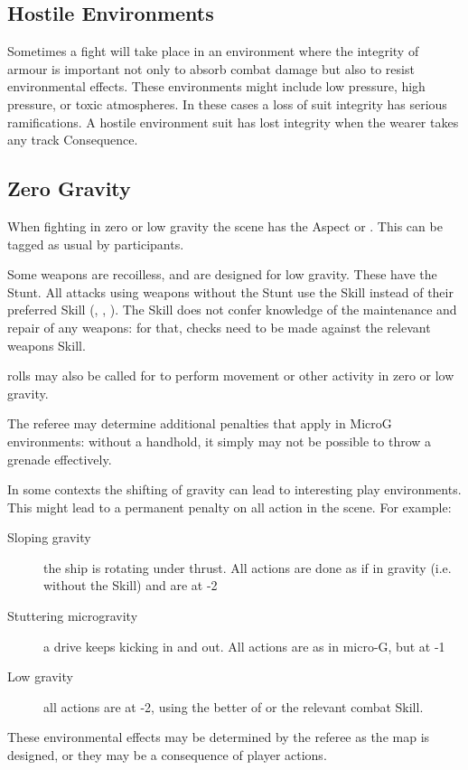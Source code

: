 \subsection{Hostile Environments}\label{sec:hostile-environments}

Sometimes a fight will take place in an environment where the integrity of armour is important not only to absorb combat damage but also to resist environmental effects. These environments might include low pressure, high pressure, or toxic atmospheres. In these cases a loss of suit integrity has serious ramifications. A hostile environment suit has lost integrity when the wearer takes any \Health{} track Consequence.

\iflandscape{}{\vfil}
\subsection{Zero Gravity}\label{sec:zero-gravity}

When fighting in zero or low gravity the scene has the Aspect  or . This can be tagged as usual by participants.

Some weapons are recoilless, and are designed for low gravity. These have the  Stunt. All attacks using weapons without the  Stunt use the  Skill instead of their preferred Skill (, , ). The  Skill does not confer knowledge of the maintenance and repair of any weapons: for that, checks need to be made against the relevant weapons Skill.

 rolls may also be called for to perform movement or other activity in zero or low gravity.

The referee may determine additional penalties that apply in MicroG environments: without a handhold, it simply may not be possible to throw a grenade effectively.

In some contexts the shifting of gravity can lead to interesting play environments. This might lead to a permanent penalty on all action in the scene. For example:
\begin{description}
\item [Sloping gravity]
the ship is rotating under thrust. All actions are done as if in gravity (i.e. without the  Skill) and are at -2
\item [Stuttering microgravity]
a drive keeps kicking in and out. All actions are as in micro-G, but at -1
\item [Low gravity]
all actions are at -2, using the better of  or the relevant combat Skill.
\end{description}

These environmental effects may be determined by the referee as the map is designed, or they may be a consequence of player actions.

